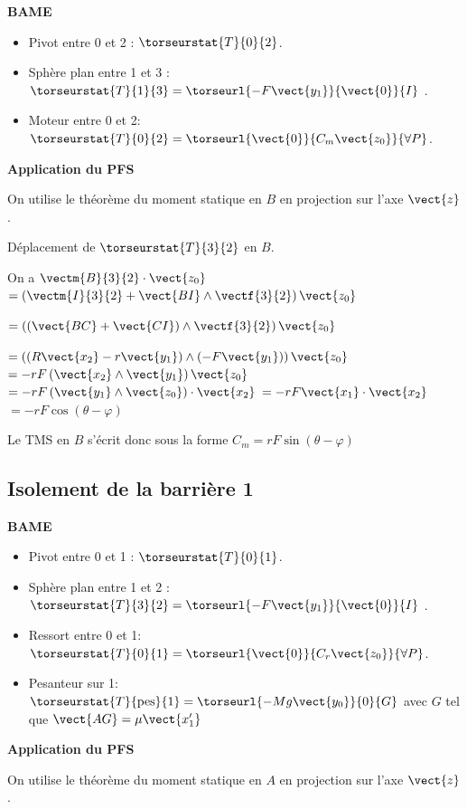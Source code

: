 \textbf{BAME}
\begin{itemize}
\item Pivot entre 0 et 2 : $\torseurstat{T}{0}{2}$.
\item Sphère plan entre 1 et 3 : $\torseurstat{T}{1}{3}= \torseurl{-F\vect{y_1}}{\vect{0}}{I}$ .
\item Moteur entre 0 et 2: $\torseurstat{T}{0}{2}= \torseurl{\vect{0}}{C_m\vect{z_0}}{\forall P}$.
\end{itemize}

\textbf{Application du PFS}

On utilise le théorème du moment statique en $B$ en projection sur l'axe $\vect{z}$.

Déplacement de  $\torseurstat{T}{3}{2}$ en $B$.

On a $\vectm{B}{3}{2}\cdot\vect{z_0}$ 
$=\left(\vectm{I}{3}{2}+\vect{BI}\wedge\vectf{3}{2}\right)\vect{z_0}$

$=\left(\left(\vect{BC}+\vect{CI}\right)\wedge\vectf{3}{2}\right)\vect{z_0}$

$=\left(\left(R\vect{x_2}-r\vect{y_1}\right)\wedge\left(-F\vect{y_1}\right)\right)\vect{z_0}$
$=-rF\left(\vect{x_2}\wedge\vect{y_1}\right)\vect{z_0}$
$=-rF\left(\vect{y_1}\wedge\vect{z_0}\right)\cdot\vect{x_2}$
$=-rF\vect{x_1}\cdot\vect{x_2}$
$=-rF\cos\left( \theta-\varphi\right)$

Le TMS en $B$ s'écrit donc sous la forme 
$C_m=rF\sin\left( \theta-\varphi\right)$


\subsection{Isolement de la barrière 1}

\textbf{BAME}
\begin{itemize}
\item Pivot entre 0 et 1 : $\torseurstat{T}{0}{1}$.
\item Sphère plan entre 1 et 2 : $\torseurstat{T}{3}{2}= \torseurl{-F\vect{y_1}}{\vect{0}}{I}$ .
\item Ressort entre 0 et 1: $\torseurstat{T}{0}{1}= \torseurl{\vect{0}}{C_r\vect{z_0}}{\forall P}$.
\item Pesanteur sur 1: $\torseurstat{T}{\text{pes}}{1}= \torseurl{-Mg\vect{y_0}}{0}{G}$ avec $G$ tel que $\vect{AG}=\mu\vect{x_{1}'}$
\end{itemize}

\textbf{Application du PFS}

On utilise le théorème du moment statique en $A$ en projection sur l'axe $\vect{z}$.

